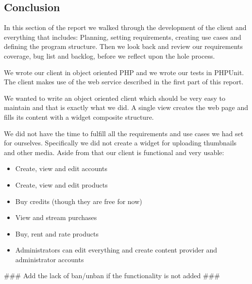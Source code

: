 \subsection{Conclusion}
In this section of the report we walked through the development of the client and everything that includes: Planning, setting requirements, creating use cases and defining the program structure. Then we look back and review our requirements coverage, bug list and backlog, before we reflect upon the hole process.

We wrote our client in object oriented PHP and we wrote our tests in PHPUnit. The client makes use of the web service described in the first part of this report.

We wanted to write an object oriented client which should be very easy to maintain and that is exactly what we did. A single view creates the web page and fills its content with a widget composite structure.

We did not have the time to fulfill all the requirements and use cases we had set for ourselves. Specifically we did not create a widget for uploading thumbnails and other media. Aside from that our client is functional and very usable:
\begin{itemize}
\item Create, view and edit accounts
\item Create, view and edit products
\item Buy credits (though they are free for now)
\item View and stream purchases
\item Buy, rent and rate products
\item Administrators can edit everything and create content provider and administrator accounts
\end{itemize}

\#\#\# Add the lack of ban/unban if the functionality is not added \#\#\#
\newpage